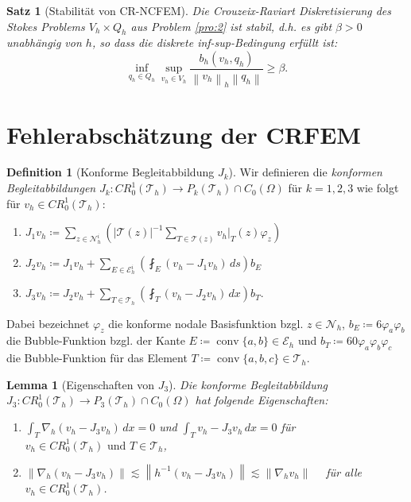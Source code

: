 \documentclass[a4paper, 10pt]{article}
\newcommand{\norm}[1][\cdot]{\left\lVert#1\right\rVert}
\newcommand{\dx}{\,dx}
\newcommand{\mesh}{\mathcal{T}_h}
\newcommand{\edges}{\mathcal{E}_h}
\newcommand{\nodes}{\mathcal{N}_h}
\newcommand{\crs}{CR_0^1}
\DeclareMathOperator{\conv}{conv}
\theoremstyle{definition}
\newtheorem{definition}{Definition}
\theoremstyle{plain}
\newtheorem{satz}{Satz}
\newtheorem{lemma}{Lemma}
\begin{document}
\begin{satz}[Stabilität von CR-NCFEM]\label{thm:3}
  Die Crouzeix-Raviart Diskretisierung des Stokes Problems \(V_h
  \times Q_h\) aus Problem \ref{pro:2} ist stabil, d.h. es gibt
  \(\beta > 0\) unabhängig von \(h\), so dass die \emph{diskrete
  inf-sup-Bedingung} erfüllt ist:
  \[
  \inf_{q_h \in Q_h} \sup_{v_h \in V_h} \frac{b_h(v_h, q_h)}{\norm[v_h]_h \norm[q_h]} \geq \beta. 
  \]
\end{satz}

\thispagestyle{plain}


\section{Fehlerabschätzung der CRFEM}
\label{sec:fehl-der-crfem}

\begin{definition}[Konforme Begleitabbildung \(J_k\)]\label{def:3}
  Wir definieren die \emph{konformen Begleitabbildungen} \(J_k \colon
  \crs(\mesh) \to P_k(\mesh)\cap C_0(\Omega)\) für
  \(k=1,2,3\) wie folgt für \(v_h \in \crs(\mesh)\): 
  \begin{enumerate}[label=\textit{(\roman*)}]
  \item \(J_1 v_h \coloneqq \sum_{z \in
      \nodes^i}\left(\left\lvert \mathcal{T}(z)\right\rvert^{-1}
      \sum_{T\in \mathcal{T}(z)} v_h\vert_T(z) \varphi_z \right)\)
  \item \(J_2 v_h \coloneqq J_1 v_h + \sum_{E\in\edges^i} 
    \left(\fint_E (v_h - J_1 v_h) \,ds\right)b_E\)
  \item \(J_3 v_h \coloneqq J_2 v_h + \sum_{T\in\mesh}\left(\fint_T(v_h
      - J_2 v_h)\dx \right)b_T\). 
  \end{enumerate}
  Dabei bezeichnet \(\varphi_z\) die konforme nodale Basisfunktion
  bzgl. \(z \in \nodes\), \(b_E \coloneqq 6\varphi_a\varphi_b\) die
  Bubble-Funktion bzgl. der Kante \(E \coloneqq \conv\{a,b\} \in
  \edges\) und \(b_T \coloneqq 60\varphi_a\varphi_b\varphi_c\) die
  Bubble-Funktion für das Element \(T \coloneqq \conv\{a,b,c\} \in
  \mesh\). 
\end{definition}

\vspace{3mm}

\begin{lemma}[Eigenschaften von \(J_3\)]\label{lem:2}
  Die konforme Begleitabbildung \(J_3\colon \crs(\mesh) \to
  P_3(\mesh)\cap C_0(\Omega)\) hat folgende Eigenschaften: 
  \begin{enumerate}[label=(\roman*)]
  \item \(\int_T \nabla_h(v_h - J_3 v_h)\dx = 0\) und \(\int_T
    v_h - J_3 v_h \dx = 0 \) für \(v_h \in
    \crs(\mesh) \text{ und } T\in \mesh\),
  \item \(\norm[\nabla_h (v_h - J_3 v_h)] \lesssim \norm[h^{-1}(v_h -
      J_3 v_h)] \lesssim \norm[\nabla_h v_h] \quad\) für alle \(v_h \in
    \crs(\mesh)\).
  \end{enumerate}
\end{lemma}
\end{document}
